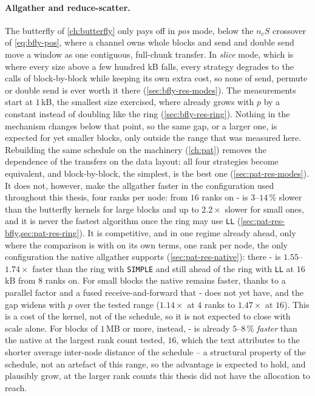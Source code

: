 \paragraph{Allgather and reduce-scatter.}
The butterfly of \cref{ch:butterfly} only pays off in \emph{pos} mode, below the $n_cS$ crossover of \cref{eq:bfly-pos}, where a channel owns whole blocks and send and double send move a window as one contiguous, full-chunk transfer. In \emph{slice} mode, which is where every size above a few hundred kB falls, every strategy degrades to the calls of block-by-block while keeping its own extra cost, so none of send, permute or double send is ever worth it there (\cref{sec:bfly-res-modes}).
The measurements start at $1$\,kB, the smallest size exercised, where \bine{} already grows with $p$ by a constant instead of doubling like the ring (\cref{sec:bfly-res-ring}). Nothing in the mechanism changes below that point, so the same gap, or a larger one, is expected for yet smaller blocks, only outside the range that was measured here.
Rebuilding the same schedule on the \pat{} machinery (\cref{ch:pat}) removes the dependence of the transfers on the data layout: all four strategies become equivalent, and block-by-block, the simplest, is the best one (\cref{sec:pat-res-modes}).
It does not, however, make the allgather faster in the configuration used throughout this thesis, four ranks per node: from $16$ ranks on \bine{}-\pat{} is $3$--$14\,\%$ slower than the butterfly kernels for large blocks and up to $2.2\times$ slower for small ones, and it is never the fastest algorithm once the ring may use \texttt{LL} (\cref{sec:pat-res-bfly,sec:pat-res-ring}).
It is competitive, and in one regime already ahead, only where the comparison is with \pat{} on its own terms, one rank per node, the only configuration the native \nccl{} \pat{} allgather supports (\cref{sec:pat-res-native}): there \bine{}-\pat{} is $1.55$--$1.74\times$ faster than the ring with \texttt{SIMPLE} and still ahead of the ring with \texttt{LL} at $16$\,kB from $8$ ranks on.
For small blocks the native \pat{} remains faster, thanks to a parallel factor and a fused receive-and-forward that \bine{}-\pat{} does not yet have, and the gap widens with $p$ over the tested range ($1.14\times$ at $4$ ranks to $1.47\times$ at $16$). This is a cost of the kernel, not of the schedule, so it is not expected to close with scale alone.
For blocks of $1$\,MB or more, instead, \bine{}-\pat{} is already $5$--$8\,\%$ \emph{faster} than the native \pat{} at the largest rank count tested, $16$, which the text attributes to the shorter average inter-node distance of the \bine{} schedule -- a structural property of the schedule, not an artefact of this range, so the advantage is expected to hold, and plausibly grow, at the larger rank counts this thesis did not have the allocation to reach.


